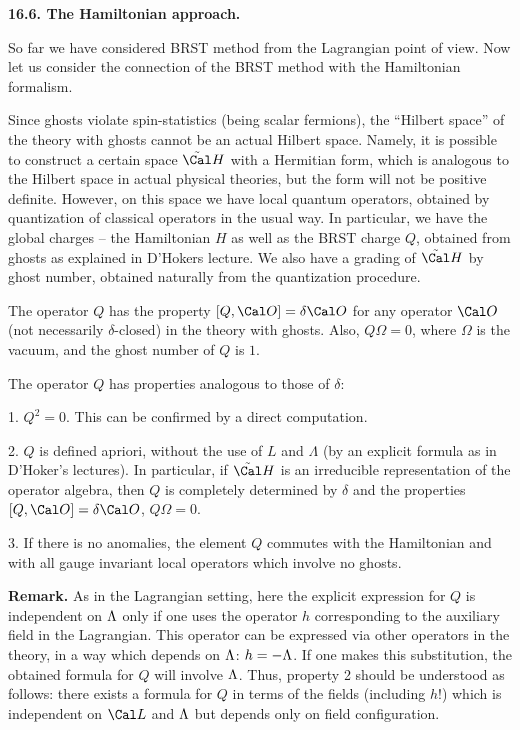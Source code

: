 {\bf 16.6. The Hamiltonian approach.}

So far we have considered BRST method from the Lagrangian point of view. 
Now let us consider the connection of the BRST method with the Hamiltonian 
formalism. 

Since ghosts violate spin-statistics (being scalar fermions), 
the ``Hilbert space'' of the theory with ghosts cannot be an actual Hilbert 
space. Namely, it is possible to construct a certain space 
$\tilde\Cal H$ with a Hermitian 
form, which is analogous to the Hilbert space in actual physical theories, 
but the form will not be positive definite. However, on this space 
we have local quantum operators, 
obtained by quantization of classical operators
in the usual way. In particular, we have 
the global charges -- the Hamiltonian $H$ as well as the BRST charge $Q$, 
obtained from ghosts as explained in D'Hokers lecture. 
We also have a grading of $\tilde\Cal H$ by ghost number, obtained 
naturally from the quantization procedure. 

The operator $Q$ has the property $[Q,\O]=\delta\O$ 
for any operator $\O$ (not necessarily $\delta$-closed)
in the theory with ghosts. Also, $Q\Omega=0$, 
where $\Omega$ is the vacuum, and the ghost number of $Q$ is $1$. 

The operator $Q$ has properties 
analogous to those of $\delta$: 

1. $Q^2=0$. This can be confirmed by a direct computation. 

2. $Q$ is defined apriori, without the use of $L$ and $\Lambda$
(by an explicit formula as in D'Hoker's lectures). 
In particular, if $\tilde\Cal H$ is an irreducible representation 
of the operator algebra, then $Q$ is completely determined by $\delta$
and the properties $[Q,\O]=\delta\O$, $Q\Omega=0$. 

3. If there is no anomalies, the element $Q$ commutes 
with the Hamiltonian and with all gauge invariant local operators 
which involve no ghosts. 

{\bf Remark.} As in the Lagrangian setting, here the explicit expression 
for $Q$ is independent on $\Lambda$ only if one uses the operator $h$ 
corresponding to the auxiliary field in the Lagrangian. This operator 
can be 
expressed via other operators in the theory, in a way which depends on $\Lambda$:
$h=-\Lambda$. If one makes this substitution, the obtained formula 
for $Q$ will involve $\Lambda$. Thus, property 2 should be understood as follows: 
there exists a formula for $Q$ in terms of the fields (including $h$!)
which is independent on $\Cal L$ and $\Lambda$ but depends only on field 
configuration. 

